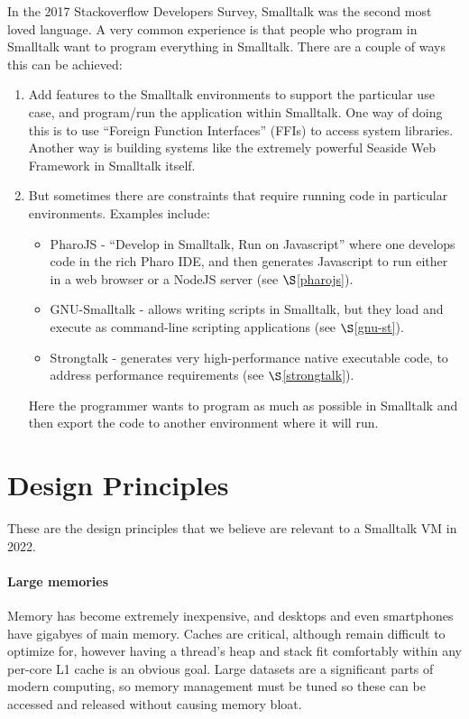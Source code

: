 \documentclass[
]{ceurart}
\def\secref{$\S$\ref}
\begin{document}
In the 2017 Stackoverflow Developers Survey\cite{stackoverflow-survey-2017}, Smalltalk was the second most loved language.
A very common experience is that people who program in Smalltalk want to program everything in Smalltalk.
There are a couple of ways this can be achieved:
\begin{enumerate}
\item Add features to the Smalltalk environments to support the particular use case, and program/run the application within Smalltalk.
  One way of doing this is to use ``Foreign Function Interfaces'' (FFIs) to access system libraries.
  Another way is building systems like the extremely powerful Seaside Web Framework\cite{Seaside-server} in Smalltalk itself.
\item But sometimes there are constraints that require running code in particular environments.
  Examples include:
  \begin{itemize}
  \item PharoJS - ``Develop in Smalltalk, Run on Javascript'' where one develops code in the rich Pharo IDE, and then generates Javascript to run either in a web browser or a NodeJS server (see \secref{pharojs}).
  \item GNU-Smalltalk - allows writing scripts in Smalltalk, but they load and execute as command-line scripting applications (see \secref{gnu-st}).
  \item Strongtalk - generates very high-performance native executable code, to address performance requirements (see \secref{strongtalk}).
  \end{itemize}
  Here the programmer wants to program as much as possible in Smalltalk and then export the code to another environment where it will run.
\end{enumerate}

\section{Design Principles}
These are the design principles that we believe are relevant to a Smalltalk VM in 2022.
\paragraph{Large memories}
Memory has become extremely inexpensive, and desktops and even smartphones have gigabyes of main memory.
Caches are critical, although remain difficult to optimize for, however having a thread's heap and stack fit comfortably within any per-core L1 cache is an obvious goal.
Large datasets are a significant parts of modern computing, so memory management must be tuned so these can be accessed and released without causing memory bloat.
\end{document}
